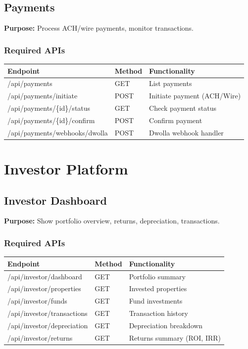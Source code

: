 \documentclass[11pt,a4paper]{article}
\begin{document}
\subsection{Payments}

\textbf{Purpose:} Process ACH/wire payments, monitor transactions.

\subsubsection{Required APIs}

\begin{longtable}{|p{5cm}|p{2cm}|p{6cm}|}
\hline
\textbf{Endpoint} & \textbf{Method} & \textbf{Functionality} \\
\hline
/api/payments & GET & List payments \\
/api/payments/initiate & POST & Initiate payment (ACH/Wire) \\
/api/payments/\{id\}/status & GET & Check payment status \\
/api/payments/\{id\}/confirm & POST & Confirm payment \\
/api/payments/webhooks/dwolla & POST & Dwolla webhook handler \\
\hline
\end{longtable}

\newpage

\section{Investor Platform}

\subsection{Investor Dashboard}

\textbf{Purpose:} Show portfolio overview, returns, depreciation, transactions.

\subsubsection{Required APIs}

\begin{longtable}{|p{5cm}|p{2cm}|p{6cm}|}
\hline
\textbf{Endpoint} & \textbf{Method} & \textbf{Functionality} \\
\hline
/api/investor/dashboard & GET & Portfolio summary \\
/api/investor/properties & GET & Invested properties \\
/api/investor/funds & GET & Fund investments \\
/api/investor/transactions & GET & Transaction history \\
/api/investor/depreciation & GET & Depreciation breakdown \\
/api/investor/returns & GET & Returns summary (ROI, IRR) \\
\hline
\end{longtable}
\end{document}
